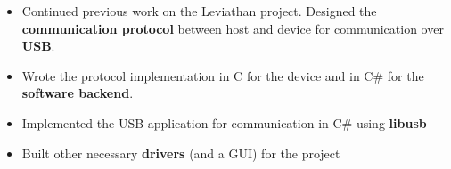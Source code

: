 


	\begin{fullwidth}
		\makecvheader
	\end{fullwidth}





    \begin{itemize}
        \item Continued previous work on the Leviathan project. Designed the \textbf{communication protocol} between host and device for communication over \textbf{USB}. 
		\item Wrote the protocol implementation in C for the device and in C\# for the \textbf{software backend}. 
		\item Implemented the USB application for communication in C\# using \textbf{libusb}
		\item Built other necessary \textbf{drivers} (and a GUI) for the project 
            \smallskip

    \end{itemize}

	\divider

